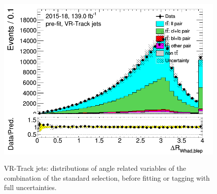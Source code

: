 \begin{figure}[H]
\includegraphics[width=.45\textwidth]{FTAG_plots/pretagNoRwwithouthighpTVRJetsall/DataMC_h_dRWhadbleptrackjet.png} \\
\caption{VR-Track jets: distributions of angle related variables of the combination 
of the standard selection, before fitting or tagging with full uncertainties.} \label{fig:standard_angles_VRJets}
\end{figure}


